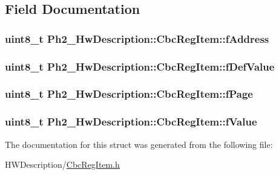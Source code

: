 \subsection{Field Documentation}
\hypertarget{struct_ph2___hw_description_1_1_cbc_reg_item_a67f6d52003832c42c7747f304d50a87d}{
\subsubsection[{f\-Address}]{\setlength{\rightskip}{0pt plus 5cm}uint8\-\_\-t Ph2\-\_\-\-Hw\-Description\-::\-Cbc\-Reg\-Item\-::f\-Address}}\label{struct_ph2___hw_description_1_1_cbc_reg_item_a67f6d52003832c42c7747f304d50a87d}
\hypertarget{struct_ph2___hw_description_1_1_cbc_reg_item_a7c958bb4e0cd79891f3d3a191ef2f749}{
\subsubsection[{f\-Def\-Value}]{\setlength{\rightskip}{0pt plus 5cm}uint8\-\_\-t Ph2\-\_\-\-Hw\-Description\-::\-Cbc\-Reg\-Item\-::f\-Def\-Value}}\label{struct_ph2___hw_description_1_1_cbc_reg_item_a7c958bb4e0cd79891f3d3a191ef2f749}
\hypertarget{struct_ph2___hw_description_1_1_cbc_reg_item_a082fb29397d4a4e2ccbf4563c1385e6e}{
\subsubsection[{f\-Page}]{\setlength{\rightskip}{0pt plus 5cm}uint8\-\_\-t Ph2\-\_\-\-Hw\-Description\-::\-Cbc\-Reg\-Item\-::f\-Page}}\label{struct_ph2___hw_description_1_1_cbc_reg_item_a082fb29397d4a4e2ccbf4563c1385e6e}
\hypertarget{struct_ph2___hw_description_1_1_cbc_reg_item_a1fa052a53215cbee674174febcc52b6a}{
\subsubsection[{f\-Value}]{\setlength{\rightskip}{0pt plus 5cm}uint8\-\_\-t Ph2\-\_\-\-Hw\-Description\-::\-Cbc\-Reg\-Item\-::f\-Value}}\label{struct_ph2___hw_description_1_1_cbc_reg_item_a1fa052a53215cbee674174febcc52b6a}


The documentation for this struct was generated from the following file\-:\begin{DoxyCompactItemize}
\item 
H\-W\-Description/\hyperlink{_cbc_reg_item_8h}{Cbc\-Reg\-Item.\-h}\end{DoxyCompactItemize}
